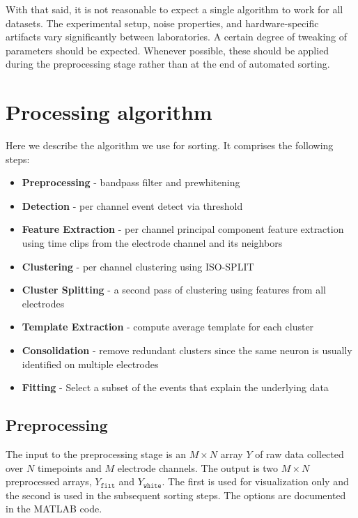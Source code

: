 \documentclass[hidelinks,10pt]{article}
\begin{document}
With that said, it is not reasonable to expect a single algorithm to work for all datasets. The experimental setup, noise properties, and hardware-specific artifacts vary significantly between laboratories. A certain degree of tweaking of parameters should be expected. Whenever possible, these should be applied during the preprocessing stage rather than at the end of automated sorting.

\section {Processing algorithm}
Here we describe the algorithm we use for sorting. It comprises the following steps:

\begin{itemize}
\item \textbf{Preprocessing} - bandpass filter and prewhitening
\item \textbf{Detection} - per channel event detect via threshold
\item \textbf{Feature Extraction} - per channel principal component feature extraction using time clips from the electrode channel and its neighbors
\item \textbf{Clustering} - per channel clustering using ISO-SPLIT
\item \textbf{Cluster Splitting} - a second pass of clustering using features from all electrodes
\item \textbf{Template Extraction} - compute average template for each cluster
\item \textbf{Consolidation} - remove redundant clusters since the same neuron is usually identified on multiple electrodes
\item \textbf{Fitting} - Select a subset of the events that explain the underlying data
\end{itemize}

\subsection {Preprocessing}

The input to the preprocessing stage is an $M\times N$ array $Y$ of raw data collected over $N$ timepoints and $M$ electrode channels. The output is two $M\times N$ preprocessed arrays, $Y_\texttt{filt}$ and $Y_\texttt{white}$. The first is used for visualization only and the second is used in the subsequent sorting steps. The options are documented in the MATLAB code.
\end{document}
